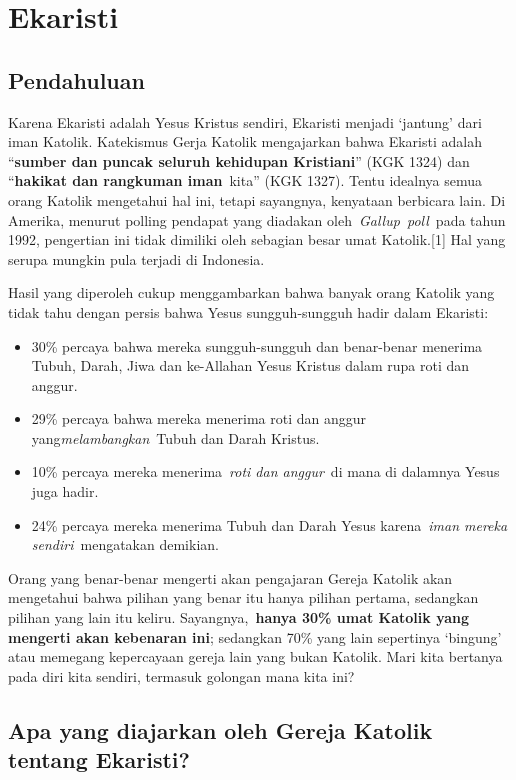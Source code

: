 \chapter{Ekaristi}
\section[Pendahuluan]{Pendahuluan}
Karena Ekaristi adalah Yesus Kristus sendiri, Ekaristi menjadi
{\textquoteleft}jantung{\textquoteright} dari iman Katolik. Katekismus
Gerja Katolik mengajarkan bahwa Ekaristi adalah
{\textquotedblleft}\textbf{sumber dan puncak seluruh kehidupan
Kristiani}{\textquotedblright} (KGK 1324) dan
{\textquotedblleft}\textbf{hakikat dan rangkuman
iman}~kita{\textquotedblright} (KGK 1327). Tentu idealnya semua orang
Katolik mengetahui hal ini, tetapi sayangnya, kenyataan berbicara lain.
Di Amerika, menurut polling pendapat yang diadakan
oleh~\emph{Gallup~poll}~pada tahun 1992, pengertian ini tidak dimiliki
oleh sebagian besar umat Katolik.[1] Hal yang serupa mungkin pula
terjadi di Indonesia.

Hasil yang diperoleh cukup menggambarkan bahwa banyak orang Katolik yang
tidak tahu dengan persis bahwa Yesus sungguh-sungguh hadir dalam
Ekaristi:

\begin{itemize}
\item 30\% percaya bahwa mereka sungguh-sungguh dan benar-benar menerima
Tubuh, Darah, Jiwa dan ke-Allahan Yesus Kristus dalam rupa roti dan
anggur.
\item 29\% percaya bahwa mereka menerima roti dan anggur
yang\emph{melambangkan}~Tubuh dan Darah Kristus.
\item 10\% percaya mereka menerima~\emph{roti dan anggur}~di mana di
dalamnya Yesus juga hadir.
\item 24\% percaya mereka menerima Tubuh dan Darah Yesus
karena~\emph{iman mereka sendiri}~mengatakan demikian.
\end{itemize}
Orang yang benar-benar mengerti akan pengajaran Gereja Katolik akan
mengetahui bahwa pilihan yang benar itu hanya pilihan pertama,
sedangkan pilihan yang lain itu keliru. Sayangnya,~\textbf{hanya 30\%
umat Katolik yang mengerti akan kebenaran ini}; sedangkan 70\% yang
lain sepertinya {\textquoteleft}bingung{\textquoteright} atau memegang
kepercayaan gereja lain yang bukan Katolik. Mari kita bertanya pada
diri kita sendiri, termasuk golongan mana kita ini?

\section[Apa yang diajarkan oleh Gereja Katolik tentang
Ekaristi?]{Apa yang diajarkan oleh Gereja Katolik tentang Ekaristi?}

